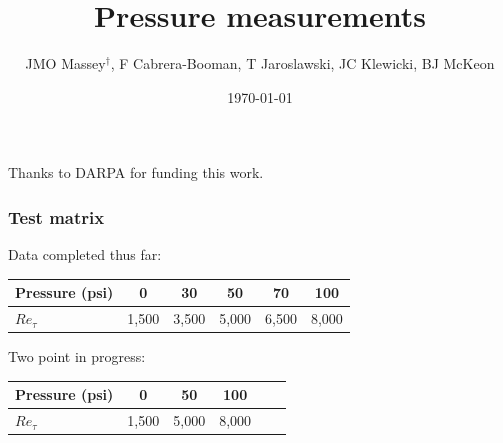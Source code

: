 \documentclass[aspectratio=169,10pt]{beamer}
\title{Pressure measurements}
\author{JMO Massey$^{\dag}$, F Cabrera-Booman, T Jaroslawski, JC Klewicki, BJ McKeon}
\institute{Center for Turbulence Research \\ Stanford University}
\date{\today}
\begin{document}
\begin{frame}
    \setcounter{framenumber}{0}
    \titlepage
    \vfill
    {\scriptsize \centering Thanks to DARPA for funding this work.\par}
\end{frame}


\begin{frame}
    \frametitle{Test matrix}
    Data completed thus far:
    \begin{table}[]
        \centering
        \begin{tabular}{lccccc}
        \toprule
        Pressure (psi) & 0 & 30 &  50 & 70&100 \\
        \midrule
        $Re_\tau$ & 1,500  &3,500& 5,000 &6,500& 8,000 \\
        \bottomrule
        \end{tabular}
    \end{table}

    Two point in progress:
    \begin{table}[]
        \centering
        \begin{tabular}{lccccc}
        \toprule
        Pressure (psi) & 0  &  50 & 100 \\
        \midrule
        $Re_\tau$ & 1,500 & 5,000 & 8,000 \\
        \bottomrule
        \end{tabular}
    \end{table}
\end{frame}
\end{document}
